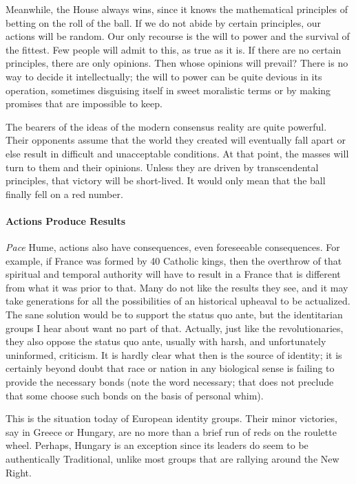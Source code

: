 Meanwhile, the House always wins, since it knows the mathematical principles of betting on the roll of the ball. If we do not abide by certain principles, our actions will be random. Our only recourse is the will to power and the survival of the fittest. Few people will admit to this, as true as it is. If there are no certain principles, there are only opinions. Then whose opinions will prevail? There is no way to decide it intellectually; the will to power can be quite devious in its operation, sometimes disguising itself in sweet moralistic terms or by making promises that are impossible to keep.

The bearers of the ideas of the modern consensus reality are quite powerful. Their opponents assume that the world they created will eventually fall apart or else result in difficult and unacceptable conditions. At that point, the masses will turn to them and their opinions. Unless they are driven by transcendental principles, that victory will be short-lived. It would only mean that the ball finally fell on a red number.

\paragraph{Actions Produce Results}


\emph{Pace} Hume, actions also have consequences, even foreseeable consequences. For example, if France was formed by 40 Catholic kings, then the overthrow of that spiritual and temporal authority will have to result in a France that is different from what it was prior to that. Many do not like the results they see, and it may take generations for all the possibilities of an historical upheaval to be actualized. The sane solution would be to support the status quo ante, but the identitarian groups I hear about want no part of that. Actually, just like the revolutionaries, they also oppose the status quo ante, usually with harsh, and unfortunately uninformed, criticism. It is hardly clear what then is the source of identity; it is certainly beyond doubt that race or nation in any biological sense is failing to provide the necessary bonds (note the word necessary; that does not preclude that some choose such bonds on the basis of personal whim).

This is the situation today of European identity groups. Their minor victories, say in Greece or Hungary, are no more than a brief run of reds on the roulette wheel. Perhaps, Hungary is an exception since its leaders do seem to be authentically Traditional, unlike most groups that are rallying around the New Right.

